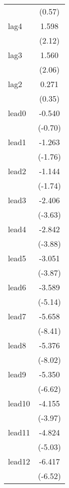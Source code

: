 {\begin{tabular}{l*{1}{c}}
            &      (0.57)         \\
[1em]
lag4        &       1.598\sym{*}  \\
            &      (2.12)         \\
[1em]
lag3        &       1.560\sym{*}  \\
            &      (2.06)         \\
[1em]
lag2        &       0.271         \\
            &      (0.35)         \\
[1em]
lead0       &      -0.540         \\
            &     (-0.70)         \\
[1em]
lead1       &      -1.263         \\
            &     (-1.76)         \\
[1em]
lead2       &      -1.144         \\
            &     (-1.74)         \\
[1em]
lead3       &      -2.406\sym{***}\\
            &     (-3.63)         \\
[1em]
lead4       &      -2.842\sym{***}\\
            &     (-3.88)         \\
[1em]
lead5       &      -3.051\sym{***}\\
            &     (-3.87)         \\
[1em]
lead6       &      -3.589\sym{***}\\
            &     (-5.14)         \\
[1em]
lead7       &      -5.658\sym{***}\\
            &     (-8.41)         \\
[1em]
lead8       &      -5.376\sym{***}\\
            &     (-8.02)         \\
[1em]
lead9       &      -5.350\sym{***}\\
            &     (-6.62)         \\
[1em]
lead10      &      -4.155\sym{***}\\
            &     (-3.97)         \\
[1em]
lead11      &      -4.824\sym{***}\\
            &     (-5.03)         \\
[1em]
lead12      &      -6.417\sym{***}\\
            &     (-6.52)         \\

\end{tabular}}
